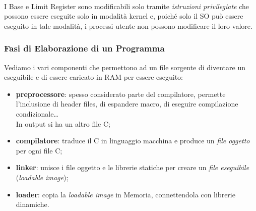 \documentclass{article}
\begin{document}
				\begin{figure}[ht!]
				\end{figure}
				\\I Base e Limit Register sono modificabili solo tramite \textit{istruzioni privilegiate} che possono essere eseguite solo in modalità kernel e, poiché solo il SO può essere eseguito in tale modalità, i processi utente non possono modificare il loro valore.

			\newpage
			\subsubsection{Fasi di Elaborazione di un Programma}
				Vediamo i vari componenti che permettono ad un file sorgente di diventare un eseguibile e di essere caricato in RAM per essere eseguito:
				\begin{itemize}
					\item \textbf{preprocessore}: spesso considerato parte del compilatore, permette l'inclusione di header files, di espandere macro, di eseguire compilazione condizionale\dots 
					\\In output si ha un altro file C;
					\item \textbf{compilatore}: traduce il C in linguaggio macchina e produce un \textit{file oggetto} per ogni file C;
					\item \textbf{linker}: unisce i file oggetto e le librerie statiche per creare un \textit{file eseguibile} (\textit{loadable image});
					\item \textbf{loader}: copia la \textit{loadable image} in Memoria, connettendola con librerie dinamiche.
				\end{itemize}
				\begin{figure}[ht!]
				\end{figure}
			
\end{document}
